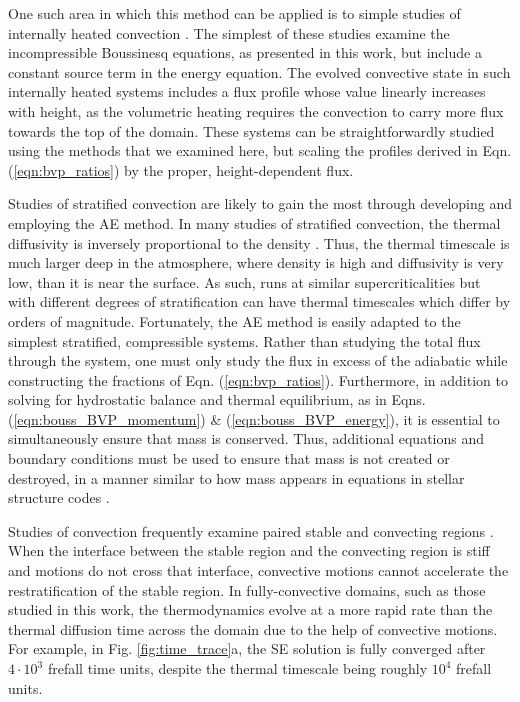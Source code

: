 \documentclass[aps, pre, onecolumn, nofootinbib, notitlepage, groupedaddress, amsfonts, amssymb, amsmath, longbibliography]{revtex4-1}
\begin{document}
One such area in which this method can be applied is to simple studies of
internally heated convection \cite{goluskin2016}.  The simplest of these studies 
examine the incompressible Boussinesq equations, as presented in this work,
but include a constant source term in the energy equation. The evolved convective
state in such internally heated systems includes a flux profile whose value linearly
increases with height, as the volumetric heating requires the convection to carry
more flux towards the top of the domain.  These systems can be straightforwardly
studied using the methods that we examined here, but scaling the profiles derived
in Eqn. (\ref{eqn:bvp_ratios}) by the proper, height-dependent flux.

Studies of stratified convection are likely to gain the most through
developing and employing the AE method.
In many studies of stratified convection, the thermal diffusivity
is inversely proportional to the density \cite{anders&brown2017}. Thus, the
thermal timescale is much larger deep in the atmosphere, where density is high and diffusivity
is very low, than it is near the surface.  As such, runs at similar supercriticalities
but with different degrees of stratification can have thermal timescales which
differ by orders of magnitude.  Fortunately, the AE method is easily adapted to
the simplest stratified, compressible systems.  Rather than studying the total
flux through the system, one must only study the flux in excess of the adiabatic
while constructing the fractions of Eqn. (\ref{eqn:bvp_ratios}).  
Furthermore, in addition to solving for
hydrostatic balance and thermal equilibrium, as in Eqns. (\ref{eqn:bouss_BVP_momentum})
\& (\ref{eqn:bouss_BVP_energy}), it is essential to simultaneously
ensure that mass is conserved.  Thus, additional equations and boundary conditions
must be used to ensure that mass is not created or destroyed,
in a manner similar to how mass appears in equations in stellar structure codes
\cite{paxton&all2011}.

Studies of convection frequently examine paired stable and convecting regions
\cite{hurlburt&all1986, brandenburg&all2005, couston&all2017}.
When the interface between the stable region
and the convecting region is stiff and motions do not cross that interface,
convective motions cannot accelerate the restratification of the stable region.
In fully-convective domains, such as those studied in this work, the thermodynamics evolve
at a more rapid rate than the thermal diffusion time across the domain due to
the help of convective motions.  For example, in Fig. \ref{fig:time_trace}a,
the SE solution is fully converged after $4\cdot 10^3$ frefall time units,
despite the thermal timescale being roughly $10^4$ frefall units.
\end{document}
